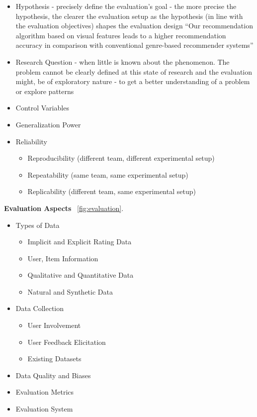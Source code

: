 \documentclass[\myFontSize,oneside,english,hidelinks,a4paper]{article}
\begin{document}
\begin{itemize}
\item Hypothesis - precisely define the evaluation’s goal - the more precise the hypothesis, the clearer
the evaluation setup as the hypothesis (in line with the evaluation objectives) shapes the evaluation design
“Our recommendation algorithm based on visual features leads to a higher recommendation accuracy in comparison with conventional genre-based recommender systems” 

\item Research Question -  when little is known about the phenomenon. The problem cannot be clearly defined at this state of research and the evaluation might, be of exploratory nature - to get a better understanding of a problem or explore patterns

\item Control Variables
\item Generalization Power
\item Reliability
	\begin{itemize}
	\item Reproducibility (different team, different experimental setup)
	\item Repeatability (same team, same experimental setup)
	\item Replicability (different team, same experimental setup)
	\end{itemize}
\end{itemize}
%
%
%
\textbf{Evaluation Aspects} ~\ref{fig:evaluation}.
%
\begin{itemize}
\item Types of Data
	\begin{itemize}
	\item Implicit and Explicit Rating Data
	\item User, Item Information
	\item Qualitative and Quantitative Data
	\item Natural and Synthetic Data
	\end{itemize}
\item Data Collection
	\begin{itemize}
	\item User Involvement
	\item User Feedback Elicitation
	\item Existing Datasets
	\end{itemize}
\item Data Quality and Biases
\item Evaluation Metrics
\item Evaluation System
\end{itemize}
\end{document}
